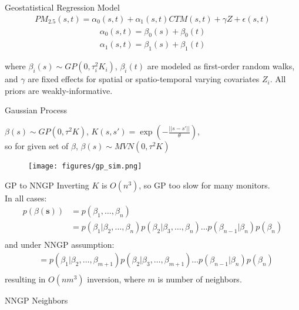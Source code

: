 \documentclass{beamer}
\begin{document}
\begin{frame}{Geostatistical Regression Model}
    \begin{align*} 
        PM_{2.5}(s,t) = \alpha_0(s, t) + \alpha_1(s, t) CTM(s, t) + \gamma Z + \epsilon(s, t)
    \end{align*}
    \begin{align*}
        \alpha_0(s, t) = \beta_0(s) + \beta_0(t)  \\
        \alpha_1(s, t) = \beta_1(s) + \beta_1(t)
    \end{align*} 


    where $\beta_i(s) \sim GP(0, \tau_i^2 K_i)$, $\beta_i(t)$ are modeled as first-order random walks, and $\gamma$ are fixed effects for spatial or spatio-temporal varying covariates $Z_i$. All priors are weakly-informative. \cite{chang2014}
\end{frame}

\begin{frame}{Gaussian Process}

        $\beta(s) \sim GP(0, \tau^2 K)$, 
    $K(s, s') = \exp\left(-\frac{||s - s'||}{\theta}\right)$,\\

    so for given set of $\beta$, $\beta(s) \sim MVN(0, \tau^2 K)$


\begin{figure}[h]
    \texttt{[image: figures/gp\_sim.png]}
    \vspace{-1cm}
\end{figure}

\end{frame}

\begin{frame}{GP to NNGP}
    Inverting $K$ is $O(n^3)$, so GP too slow for many monitors. \\
    \vspace{0.5cm}
    In all cases:
    \begin{align*}
        p(\beta(\pmb{s})) &= p(\beta_1, \dots, \beta_n) \\
                          &= p(\beta_1 | \beta_2, \dots, \beta_n) p(\beta_2 | \beta_3, \dots, \beta_n) \dots p(\beta_{n-1} | \beta_n) p(\beta_n) \\
    \end{align*}
    and under NNGP\cite{datta2014} assumption:
    \begin{align*}
                          &= p(\beta_1 | \beta_2, \dots, \beta_{m + 1}) p(\beta_2 | \beta_3, \dots, \beta_{m + 1}) \dots p(\beta_{n-1} | \beta_n) p(\beta_n) \\
    \end{align*}
    resulting in $O(nm^3)$ inversion, where $m$ is number of neighbors. 

\end{frame}
\begin{frame}{NNGP Neighbors}
\end{frame}
\end{document}
